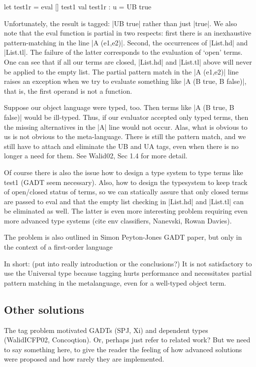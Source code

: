 \documentclass[preprint]{sigplanconf}
\begin{document}
\begin{code}
  let test1r = eval [] test1
  val test1r : u = UB true 
\end{code}

Unfortunately, the result is tagged: |UB true| rather than just
|true|. We also note that the eval function is partial in two
respects: first there is an inexhaustive pattern-matching in the 
line |A (e1,e2)|.
Second, the occurrences of |List.hd| and |List.tl|.
The failure of the latter corresponds to the evaluation of `open'
terms. One can see that if all our terms are closed, |List.hd| and
|List.tl| above will never be applied to the empty list. The partial
pattern match in the |A (e1,e2)| line raises an exception when we try to
evaluate something like |A (B true, B false)|, that is, the first
operand is not a function. 

Suppose our object language were typed, too. Then terms like
|A (B true, B false)| would be ill-typed. Thus, if our evaluator
accepted only typed terms, then the missing alternatives in the |A|
line would not occur. Alas, what is obvious to us is not obvious to
the meta-language. There is still the pattern match, and we still have
to attach and eliminate the UB and UA tags, even when there is no
longer a need for them. See Walid02, Sec 1.4 for more detail.

Of course there is also the issue how to design a type system to type
terms like test1 (GADT seem necessary). Also, how to design the
typesystem to keep track of open/closed status of terms, so we can
statically assure that only closed terms are passed to eval and that
the empty list checking in |List.hd| and |List.tl| can be eliminated
as well. The latter is even more interesting problem requiring even
more advanced type systems (cite env classifiers, Nanevski, Rowan
Davies).

The problem is also outlined in Simon Peyton-Jones GADT paper, but
only in the context of a first-order language

In short: (put into really introduction or the conclusions?)
It is not satisfactory
to use the Universal type because tagging hurts performance and
necessitates partial pattern matching in the metalanguage, even for a
well-typed object term.  


\subsection{Other solutions}
The tag problem motivated GADTs (SPJ, Xi) and dependent types
(WalidICFP02, Concoqtion). Or, perhaps just refer to related work?
But we need to say something here, to give the reader the feeling of
how advanced solutions were proposed and how rarely they are implemented.
\end{document}

